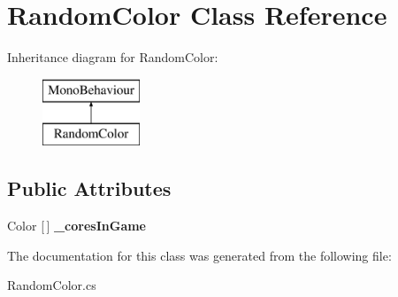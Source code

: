 \hypertarget{class_random_color}{}\section{Random\+Color Class Reference}
\label{class_random_color}
Inheritance diagram for Random\+Color\+:\begin{figure}[H]
\begin{center}
\leavevmode
\includegraphics[height=2.000000cm]{class_random_color}
\end{center}
\end{figure}
\subsection*{Public Attributes}
\begin{DoxyCompactItemize}
\item 
\mbox{\label{class_random_color_ad6618129e199ffac1319e1f7658e292b}} 
Color \mbox{[}$\,$\mbox{]} {\bfseries \+\_\+cores\+In\+Game}
\end{DoxyCompactItemize}


The documentation for this class was generated from the following file\+:\begin{DoxyCompactItemize}
\item 
Random\+Color.\+cs\end{DoxyCompactItemize}
